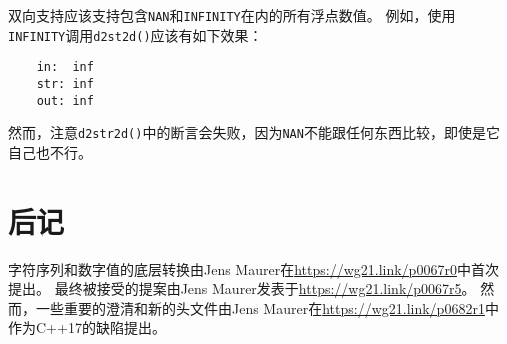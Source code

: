 双向支持应该支持包含\texttt{NAN}和\texttt{INFINITY}在内的所有浮点数值。
例如，使用\texttt{INFINITY}调用\texttt{d2st2d()}应该有如下效果：
\begin{lstlisting}
    in:  inf
    str: inf
    out: inf
\end{lstlisting}
然而，注意\texttt{d2str2d()}中的断言会失败，因为\texttt{NAN}不能跟任何东西比较，即使是它自己也不行。

\section{后记}
字符序列和数字值的底层转换由Jens Maurer在\url{https://wg21.link/p0067r0}中首次提出。
最终被接受的提案由Jens Maurer发表于\url{https://wg21.link/p0067r5}。
然而，一些重要的澄清和新的头文件由Jens Maurer在\url{https://wg21.link/p0682r1}中
作为C++17的缺陷提出。